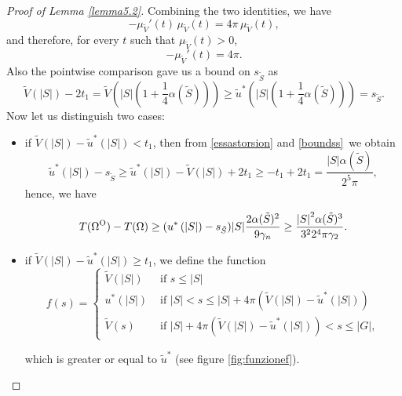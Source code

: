 \documentclass[oneside,a4paper,11pt,notitlepage]{article}
\newcommand{\abs}[1]{{\left|#1\right|}}
\theoremstyle{definition}
\theoremstyle{plain}
\theoremstyle{definition}
\newcommand{\OO}{\text{\normalfont  O}}
\begin{document}
\begin{proof}[Proof of Lemma \ref{lemma5.2}]
Combining the two identities, we have
\[
-\mu_{\tilde V}'(t)\,\mu_{\tilde V}(t) = 4\pi\,\mu_{\tilde V}(t),
\]
and therefore, for every $t$ such that $\mu_{\tilde V}(t)>0$,
\begin{equation}\label{muprimo=4pi}
-\mu_{\tilde V}'(t) = 4\pi.
\end{equation} 
     Also the pointwise comparison gave us a bound on $s_{\tilde{S}}$ as
    \begin{equation}\label{boundss}
        \tilde V(\abs{S})-2t_1=\tilde V\left(\abs{S}\left(1+\frac{1}{4}\alpha(\tilde{S})\right)\right)\geq\tilde u^\ast\left(\abs{S}\left(1+\frac{1}{4}\alpha(\tilde{S})\right)\right)=s_{\tilde{S}}.
    \end{equation}
    Now let us distinguish two cases:
    \begin{itemize}
        \item if $\tilde V(\abs{S})-\tilde u^\ast(\abs{S})<t_1$, then from \eqref{essastorsion} and \eqref{boundss}\, we obtain
        \begin{equation*}
            {\tilde u}^\ast(\abs{S})-s_{\tilde{S}}\geq\tilde u^\ast(\abs{S})-\tilde V(\abs{S})+2t_1\geq -t_1+2t_1=\frac{\abs{S}\alpha(\tilde{S})}{2^5\pi},
         \end{equation*}
        hence, we have

         \begin{equation*}
              T(\Omega^\OO)-T(\Omega)\geq   (u^\ast\left(\abs{S}\right) -s_{\tilde{S}})\abs{S}\frac{2\alpha({\tilde{S}})^2}{9\gamma_n} \geq \frac{\abs{S}^2\alpha(\tilde{S})^3}{3^22^4\pi \gamma_ 2}.
         \end{equation*}


         \item if $\tilde V(\abs{S})-\tilde u^\ast(\abs{S})\geq t_1$, we define the function \begin{equation*}%
          f(s)=
         \begin{cases}
         \tilde V (\abs{S}) & \text{ if } s \leq \abs{S}\\
             u^\ast (\abs{S})& \text{ if }  \abs{S} < s \leq \abs{S} + 4\pi \left(\tilde V(\abs{S})-\tilde u^\ast(\abs{S})\right) \\
              \tilde V(s)& \text{ if }  \abs{S} + 4 \pi \left(\tilde V(\abs{S})-\tilde u^\ast(\abs{S})\right)   <s \leq \abs{G},
         \end{cases}\end{equation*}
         
         which is greater or equal to $\tilde u^\ast$ (see figure \ref{fig:funzionef}).
         

\end{itemize}
\end{proof}
\end{document}
